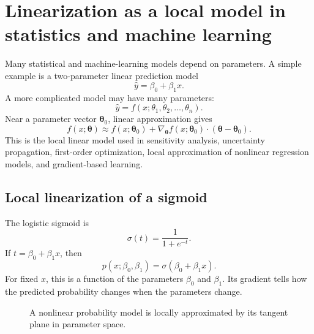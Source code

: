 \documentclass[11pt]{article}
\newcommand{\grad}{\nabla}
\newcommand{\btheta}{\boldsymbol{\theta}}
\begin{document}
\section{Linearization as a local model in statistics and machine learning}

Many statistical and machine-learning models depend on parameters. A simple example is a two-parameter linear prediction model
\[
\widehat y=\beta_0+\beta_1x.
\]
A more complicated model may have many parameters:
\[
\widehat y=f(x;\theta_1,\theta_2,\ldots,\theta_n).
\]
Near a parameter vector $\btheta_0$, linear approximation gives
\[
f(x;\btheta)\approx f(x;\btheta_0)+\grad_{\btheta}f(x;\btheta_0)\cdot(\btheta-\btheta_0).
\]
This is the local linear model used in sensitivity analysis, uncertainty propagation, first-order optimization, local approximation of nonlinear regression models, and gradient-based learning.

\subsection*{Local linearization of a sigmoid}

The logistic sigmoid is
\[
\sigma(t)=\frac{1}{1+e^{-t}}.
\]
If $t=\beta_0+\beta_1x$, then
\[
p(x;\beta_0,\beta_1)=\sigma(\beta_0+\beta_1x).
\]
For fixed $x$, this is a function of the parameters $\beta_0$ and $\beta_1$. Its gradient tells how the predicted probability changes when the parameters change.

\begin{figure}[H]
\centering
{}
\caption{A nonlinear probability model is locally approximated by its tangent plane in parameter space.}
\end{figure}
\end{document}
